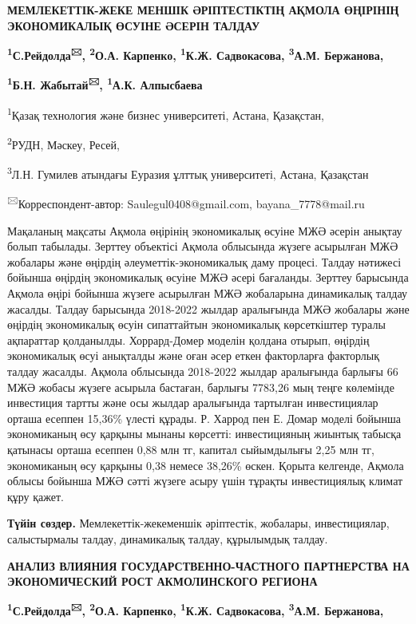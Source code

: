 {\bfseries МЕМЛЕКЕТТІК-ЖЕКЕ МЕНШІК ӘРІПТЕСТІКТІҢ АҚМОЛА ӨҢІРІНІҢ
ЭКОНОМИКАЛЫҚ ӨСУІНЕ ӘСЕРІН ТАЛДАУ}

{\bfseries \textsuperscript{1}С.Рейдолда\textsuperscript{🖂},
\textsuperscript{2}О.А. Карпенко, \textsuperscript{1}К.Ж. Садвокасова,
\textsuperscript{3}А.М. Бержанова,}

{\bfseries \textsuperscript{1}Б.Н. Жабытай\textsuperscript{🖂},
\textsuperscript{1}А.К. Алпысбаева}

\textsuperscript{1}Қазақ технология және бизнес университеті, Астана,
Қазақстан,

\textsuperscript{2}РУДН, Мәскеу, Ресей,

\textsuperscript{3}Л.Н. Гумилев атындағы Еуразия ұлттық университеті,
Астана, Қазақстан

\textsuperscript{🖂}Корреспондент-автор: Saulegul0408@gmail.com,
bayana\_7778@mail.ru

Мақаланың мақсаты Ақмола өңірінің экономикалық өсуіне МЖӘ әсерін анықтау
болып табылады. Зерттеу объектісі Ақмола облысында жүзеге асырылған МЖӘ
жобалары және өңірдің әлеуметтік-экономикалық даму процесі. Талдау
нәтижесі бойынша өңірдің экономикалық өсуіне МЖӘ әсері бағаланды.
Зерттеу барысында Ақмола өңірі бойынша жүзеге асырылған МЖӘ жобаларына
динамикалық талдау жасалды. Талдау барысында 2018-2022 жылдар аралығында
МЖӘ жобалары және өңірдің экономикалық өсуін сипаттайтын экономикалық
көрсеткіштер туралы ақпараттар қолданылды. Хоррард-Домер моделін қолдана
отырып, өңірдің экономикалық өсуі анықталды және оған әсер еткен
факторларға факторлық талдау жасалды. Ақмола облысында 2018-2022 жылдар
аралығында барлығы 66 МЖӘ жобасы жүзеге асырыла бастаған, барлығы
7783,26 мың теңге көлемінде инвестиция тартты және осы жылдар аралығында
тартылған инвестициялар орташа есеппен 15,36\% үлесті құрады. Р. Харрод
пен Е. Домар моделі бойынша экономиканың өсу қарқыны мынаны көрсетті:
инвестицияның жиынтық табысқа қатынасы орташа есеппен 0,88 млн тг,
капитал сыйымдылығы 2,25 млн тг, экономиканың өсу қарқыны 0,38 немесе
38,26\% өскен. Қорыта келгенде, Ақмола облысы бойынша МЖӘ сәтті жүзеге
асыру үшін тұрақты инвестициялық климат құру қажет.

{\bfseries Түйін сөздер.} Мемлекеттік-жекеменшік әріптестік, жобалары,
инвестициялар, салыстырмалы талдау, динамикалық талдау, құрылымдық
талдау.

{\bfseries АНАЛИЗ ВЛИЯНИЯ ГОСУДАРСТВЕННО-ЧАСТНОГО ПАРТНЕРСТВА НА
ЭКОНОМИЧЕСКИЙ РОСТ АКМОЛИНСКОГО РЕГИОНА}

{\bfseries \textsuperscript{1}С.Рейдолда\textsuperscript{🖂},
\textsuperscript{2}О.А. Карпенко, \textsuperscript{1}К.Ж. Садвокасова,
\textsuperscript{3}А.М. Бержанова,}

